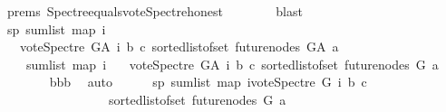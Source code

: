 \begin{isabellebody}
\ {\isachardoublequoteopen}{}{\isachardot}{\kern0pt}prems{\isachardoublequoteclose}\ Spectre{\isacharunderscore}{\kern0pt}equals{\isacharunderscore}{\kern0pt}vote{\isacharunderscore}{\kern0pt}Spectre{\isacharunderscore}{\kern0pt}honest\isanewline
\ \ \ \ \ \ \isamarkupfalse%
\ blast\ \isanewline
\ \ \ \ \isamarkupfalse%
\ \isamarkupfalse%
\ sp{}{\isacharcolon}{\kern0pt}\ {\isachardoublequoteopen}sum{\isacharunderscore}{\kern0pt}list\ {\isacharparenleft}{\kern0pt}map\ {\isacharparenleft}{\kern0pt}{\isasymlambda}i{\isachardot}{\kern0pt}\isanewline
\ \ \ {\isacharparenleft}{\kern0pt}vote{\isacharunderscore}{\kern0pt}Spectre\ G{\isacharunderscore}{\kern0pt}A\ i\ b\ c{\isacharparenright}{\kern0pt}{\isacharparenright}{\kern0pt}\ {\isacharparenleft}{\kern0pt}sorted{\isacharunderscore}{\kern0pt}list{\isacharunderscore}{\kern0pt}of{\isacharunderscore}{\kern0pt}set\ {\isacharparenleft}{\kern0pt}future{\isacharunderscore}{\kern0pt}nodes\ G{\isacharunderscore}{\kern0pt}A\ a{\isacharparenright}{\kern0pt}{\isacharparenright}{\kern0pt}{\isacharparenright}{\kern0pt}\ {\isacharequal}{\kern0pt}\ \isanewline
\ \ \ \ sum{\isacharunderscore}{\kern0pt}list\ {\isacharparenleft}{\kern0pt}map\ {\isacharparenleft}{\kern0pt}{\isasymlambda}i{\isachardot}{\kern0pt}\isanewline
\ \ \ {\isacharparenleft}{\kern0pt}vote{\isacharunderscore}{\kern0pt}Spectre\ G{\isacharunderscore}{\kern0pt}A\ i\ b\ c{\isacharparenright}{\kern0pt}{\isacharparenright}{\kern0pt}\ {\isacharparenleft}{\kern0pt}sorted{\isacharunderscore}{\kern0pt}list{\isacharunderscore}{\kern0pt}of{\isacharunderscore}{\kern0pt}set\ {\isacharparenleft}{\kern0pt}future{\isacharunderscore}{\kern0pt}nodes\ G\ a{\isacharparenright}{\kern0pt}{\isacharparenright}{\kern0pt}{\isacharparenright}{\kern0pt}\ {\isacharplus}{\kern0pt}\ {}{\isachardoublequoteclose}\ \isanewline
\ \ \ \ \ \ \isamarkupfalse%
\ bbb\ \isamarkupfalse%
\ auto\isanewline
\ \ \ \ \isamarkupfalse%
\ sp{}{\isacharcolon}{\kern0pt}\ {\isachardoublequoteopen}sum{\isacharunderscore}{\kern0pt}list\ {\isacharparenleft}{\kern0pt}map\ {\isacharparenleft}{\kern0pt}{\isasymlambda}i{\isachardot}{\kern0pt}{\isacharparenleft}{\kern0pt}vote{\isacharunderscore}{\kern0pt}Spectre\ G\ i\ b\ c{\isacharparenright}{\kern0pt}{\isacharparenright}{\kern0pt}\isanewline
\ \ \ \ \ \ \ \ \ \ \ \ \ \ \ \ \ {\isacharparenleft}{\kern0pt}sorted{\isacharunderscore}{\kern0pt}list{\isacharunderscore}{\kern0pt}of{\isacharunderscore}{\kern0pt}set\ {\isacharparenleft}{\kern0pt}future{\isacharunderscore}{\kern0pt}nodes\ G\ a{\isacharparenright}{\kern0pt}{\isacharparenright}{\kern0pt}{\isacharparenright}{\kern0pt}\ \isanewline

\end{isabellebody}
